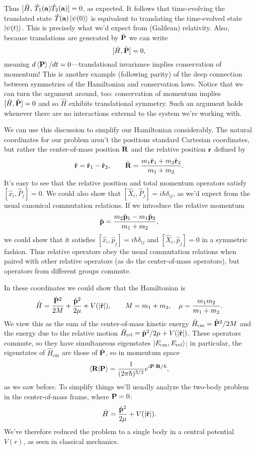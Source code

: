 \documentclass[../p116main.tex]{subfiles}
\begin{document}
Thus $[\hat H, \, \hat T_1(\mathbf{a}) \hat T_2(\mathbf{a})] = 0$, as expected.
It follows that time-evolving the translated state $\hat T(\mathbf{a}) \left| \psi(0) \right>$ is equivalent to translating the time-evolved state $\left| \psi(t) \right>$.
This is precisely what we'd expect from (Galilean) relativity.
Also, because translations are generated by $\hat{\mathbf{P}}$ we can write
\[ [\hat H, \hat{\mathbf{P}}] = 0, \]
meaning $d \left< \mathbf{P} \right> / dt = 0$---translational invariance implies conservation of momentum!
This is another example (following parity) of the deep connection between symmetries of the Hamiltonian and conservation laws.
Notice that we can turn the argument around, too: conservation of momentum implies $[\hat H, \hat{\mathbf{P}}] = 0$ and so $\hat H$ exhibits translational symmetry.
Such an argument holds whenever there  are no interactions external to the system we're working with.

We can use this discussion to simplify our Hamiltonian considerably.
The natural coordinates for our problem aren't the positions standard Cartesian coordinates, but rather the center-of-mass position $\mathbf{R}$ and the relative position $\mathbf{r}$ defined by
\[ \hat{\mathbf{r}} = \hat{\mathbf{r}}_1 - \hat{\mathbf{r}}_2, \qquad \hat{\mathbf{R}} = \frac{m_1 \hat{\mathbf{r}}_1 + m_2 \hat{\mathbf{r}}_2}{m_1 + m_2}. \]
It's easy to see that the relative position and total momentum operators satisfy $[\hat x_i, \hat P_j] = 0$.
We could also show that $[\hat X_i, \hat P_j] = i\hbar \delta_{ij}$, as we'd expect from the usual canonical commutation relations.
If we introduce the relative momentum
\[ \hat{\mathbf{p}} = \frac{m_2 \hat{\mathbf{p}}_1 - m_1 \hat{\mathbf{p}}_2}{m_1 + m_2}, \]
we could show that it satisfies $[\hat x_i, \hat p_j] = i\hbar \delta_{ij}$ and $[\hat X_i, \hat p_j] = 0$ in a symmetric fashion.
Thus relative operators obey the usual commutation relations when paired with other relative operators (as do the center-of-mass operators), but operators from different groups commute.

In these coordinates we could show that the Hamiltonian is
\[ \hat H = \frac{\hat{\mathbf{P}}^2}{2M} + \frac{\hat{\mathbf{p}}^2}{2\mu} + V(|\hat{\mathbf{r}}|), \qquad M = m_1 + m_2, \quad \mu = \frac{m_1 m_2}{m_1 + m_2}. \]
We view this as the sum of the center-of-mass kinetic energy $\hat H_\textrm{cm} = \hat{\mathbf{P}}^2 / 2M$ and the energy due to the relative motion $\hat H_\textrm{rel} = \hat{\mathbf{p}}^2 / 2\mu + V(|\hat{\mathbf{r}}|)$.
These operators commute, so they have simultaneous eigenstates $\left| E_\textrm{cm}, E_\textrm{rel} \right>$; in particular, the eigenstates of $\hat H_\textrm{cm}$ are those of $\hat{\mathbf{P}}$, so in momentum space
\[ \left< \mathbf{R} \middle| \mathbf{P} \right> = \frac{1}{(2\pi\hbar)^{3 / 2}} e^{i \mathbf{P} \cdot \mathbf{R} / \hbar}, \]
as we saw before.
To simplify things we'll usually analyze the two-body problem in the center-of-mass frame, where $\mathbf{P} = 0$:
\[ \hat H = \frac{\hat{\mathbf{p}}^2}{2\mu} + V(|\hat{\mathbf{r}}|). \]
We've therefore reduced the problem to a single body in a central potential $V(r)$, as seen in classical mechanics.
\end{document}
